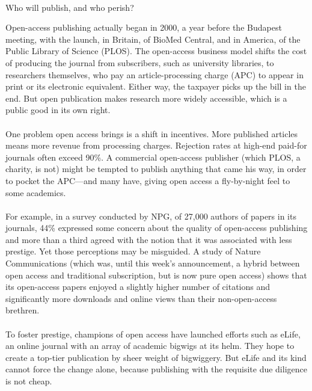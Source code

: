 \documentclass[a4paper, 12pt, UTF8]{article}
\begin{document}
\paragraph*{}
    \begin{bfseries}
        \large
        Who will publish, and who perish?
    \end{bfseries}


    Open-access publishing actually began in 2000, a year before the Budapest meeting, with the launch, in Britain, of BioMed Central, and in America, of the Public Library of Science (PLOS). The open-access business model shifts the cost of producing the journal from subscribers, such as university libraries, to researchers themselves, who pay an article-processing charge (APC) to appear in print or its electronic equivalent. Either way, the taxpayer picks up the bill in the end. But open publication makes research more widely accessible, which is a public good in its own right.

\paragraph*{}
    One problem open access brings is a shift in incentives. More published articles means more revenue from processing charges. Rejection rates at high-end paid-for journals often exceed 90\%. A commercial open-access publisher (which PLOS, a charity, is not) might be tempted to publish anything that came his way, in order to pocket the APC—and many have, giving open access a fly-by-night feel to some academics.

\paragraph*{}
    For example, in a survey conducted by NPG, of 27,000 authors of papers in its journals, 44\% expressed some concern about the quality of open-access publishing and more than a third agreed with the notion that it was associated with less prestige. Yet those perceptions may be misguided. A study of Nature Communications (which was, until this week’s announcement, a hybrid between open access and traditional subscription, but is now pure open access) shows that its open-access papers enjoyed a slightly higher number of citations and significantly more downloads and online views than their non-open-access brethren.

\paragraph*{}
    To foster prestige, champions of open access have launched efforts such as eLife, an online journal with an array of academic bigwigs at its helm. They hope to create a top-tier publication by sheer weight of bigwiggery. But eLife and its kind cannot force the change alone, because publishing with the requisite due diligence is not cheap.
\end{document}
